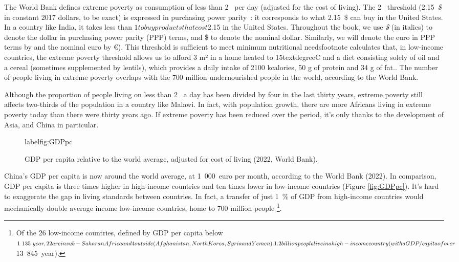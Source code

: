 \documentclass[a5paper,french,openany]{memoir}
\begin{document}
The World Bank defines extreme poverty as consumption of less than 2~\textit{\texteuro{}} per day (adjusted for the cost of living). The 2~\textit{\texteuro{}} threshold (2.15~\textit{\$} in constant 2017 dollars, to be exact) is expressed in purchasing power parity~: it corresponds to what 2.15~\$ can buy in the United States. In a country like India, it takes less than $1 to buy products that cost $2.15 in the United States. Throughout the book, we use \textit{\$} (in italics) to denote the dollar in purchasing power parity (PPP) terms, and \$ to denote the nominal dollar. Similarly, we will denote the euro in PPP terms by \textit{\teuro{}} and the nominal euro by \euro{}). %
This threshold is sufficient to meet minimum nutritional needsfootnote{\citet{allen_absolute_2017} calculates that, in low-income countries, the extreme poverty threshold allows us to afford 3 m² in a home heated to 15textdegree{}C and a diet consisting solely of oil and a cereal (sometimes supplemented by lentils), which provides a daily intake of 2100 kcalories, 50 g of protein and 34 g of fat.}. 
The number of people living in extreme poverty overlaps with the 700 million undernourished people in the world, according to the World Bank. 

Although the proportion of people living on less than 2~\textit{\texteuro{}} a day has been divided by four in the last thirty years, extreme poverty still affects two-thirds of the population in a country like Malawi. In fact, with population growth, there are more Africans living in extreme poverty today than there were thirty years ago. If extreme poverty has been reduced over the period, it's only thanks to the development of Asia, and China in particular. %

\begin{figure}[h!] 
  \caption[Inequalities in GDP per capita]{GDP per capita relative to the world average, adjusted for cost of living (2022, World Bank). %
  }label{fig:GDPpc}
\end{figure}

China's GDP per capita is now around the world average, at 1~000~euro{} per month, according to the World Bank (2022). %
In comparison, GDP per capita is three times higher in high-income countries and ten times lower in low-income countries (Figure \ref{fig:GDPpc}). It's hard to exaggerate the gap in living standards between countries. In fact, a transfer of just 1~\% of GDP from high-income countries %
would mechanically double average income 
low-income countries, home to 700 million people%
\footnote{
Of the 26 low-income countries, defined by GDP per capita %
below $1~135~\/year, 22 are in sub-Saharan Africa and 4 outside (Afghanistan, North Korea, Syria and Yemen). 1.2 billion people live in a high-income country (with a GDP/capita of over $13~845~\/year).
}. %
\end{document}
